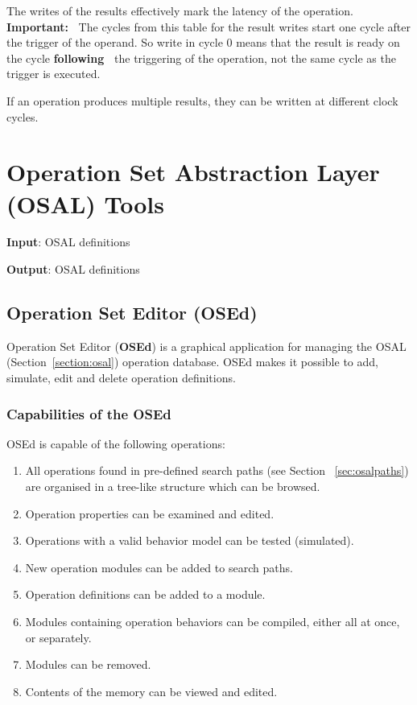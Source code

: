 \documentclass[twoside]{tceusermanual}
\begin{document}

The writes of the results effectively mark the latency of the operation.
\textbf{Important:\ }
The cycles from this table for the result writes start one cycle after the
trigger of the operand. So write in cycle 0 means that the result is ready
on the cycle \textbf{following\ } the triggering of the operation, 
not the same cycle as the trigger is executed.

If an operation produces multiple results, they can be written at different
clock cycles.

\section{Operation Set Abstraction Layer (OSAL) Tools}
\label{sec:osalTools}

 
\textbf{Input}: OSAL definitions 

\textbf{Output}: OSAL definitions

\subsection{Operation Set Editor (OSEd)}
\label{sec:osed}

Operation Set Editor (\textbf{OSEd}) is a graphical application for managing
the OSAL (Section~\ref{section:osal}) operation database. OSEd makes it possible
to add, simulate, edit and delete operation definitions. 

\subsubsection{Capabilities of the OSEd}

OSEd is capable of the following operations:

\begin{enumerate}
\item%
  All operations found in pre-defined search paths (see Section
  ~\ref{sec:osalpaths}) are organised in a tree-like structure which can be
  browsed.
\item%
  Operation properties can be examined and edited.
\item%
  Operations with a valid behavior model can be tested (simulated).
\item%
  New operation modules can be added to search paths.
\item%
  Operation definitions can be added to a module.
\item%
  Modules containing operation behaviors can be compiled, either all at
  once, or separately.
\item%
  Modules can be removed.
\item%
  Contents of the memory can be viewed and edited.
\end{enumerate}
\end{document}
